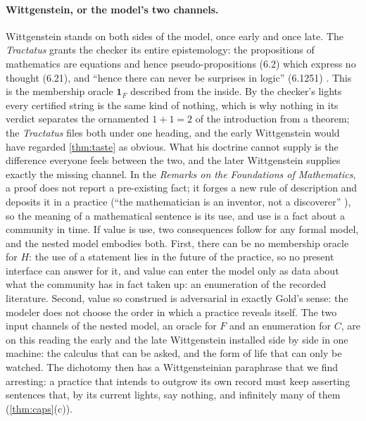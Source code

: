 \documentclass[11pt]{article}
\numberwithin{equation}{section}
\newcommand{\Amb}{F}
\newcommand{\Val}{H}
\newcommand{\Core}{C}
\theoremstyle{plain}
\theoremstyle{definition}
\theoremstyle{remark}
\begin{document}
\paragraph{Wittgenstein, or the model's two channels.}
Wittgenstein stands on both sides of the model, once early and once late. The
\emph{Tractatus} grants the checker its entire epistemology: the propositions of
mathematics are equations and hence pseudo-propositions (6.2) which express no thought
(6.21), and ``hence there can never be surprises in logic'' (6.1251)
\citep{wittgenstein1922tractatus}. This is the membership oracle $\mathbf 1_{\Amb}$
described from the inside. By the checker's lights every certified string is the same kind
of nothing, which is why nothing in its verdict separates the ornamented $1+1=2$ of the
introduction from a theorem; the \emph{Tractatus} files both under one heading, and the early
Wittgenstein would have regarded \cref{thm:taste} as obvious. What his doctrine cannot
supply is the difference everyone feels between the two, and the later Wittgenstein
supplies exactly the missing channel. In the \emph{Remarks on the Foundations of
Mathematics}, a proof does not report a pre-existing fact; it forges a new rule of
description and deposits it in a practice (``the mathematician is an inventor, not a
discoverer'' \citep{wittgenstein1956remarks}), so the meaning of a mathematical sentence
is its use, and use is a fact about a community in time. If value is use, two consequences
follow for any formal model, and the nested model embodies both. First, there can be no
membership oracle for $\Val$: the use of a statement lies in the future of the practice, so
no present interface can answer for it, and value can enter the model only as data about
what the community has in fact taken up: an enumeration of the recorded literature.
Second, value so construed is adversarial in exactly Gold's sense: the modeler does not
choose the order in which a practice reveals itself. The two input channels of the nested
model, an oracle for $\Amb$ and an enumeration for $\Core$, are on this reading the early
and the late Wittgenstein installed side by side in one machine: the calculus that can be
asked, and the form of life that can only be watched. The dichotomy then has a
Wittgensteinian paraphrase that we find arresting: a practice that intends to outgrow its
own record must keep asserting sentences that, by its current lights, say nothing, and
infinitely many of them (\cref{thm:caps}(c)).

\enlargethispage{2\baselineskip}%
\end{document}
